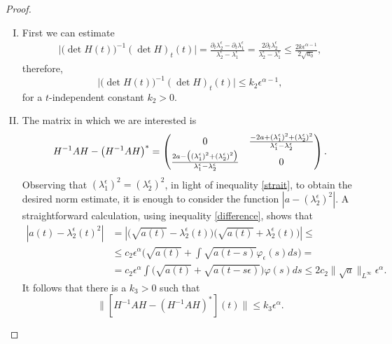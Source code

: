 \documentclass[12pt,oneside,a4paper]{book}
\numberwithin{equation}{section}     %
\theoremstyle{plain}
\theoremstyle{definition}
\begin{document}
\begin{proof}
\begin{enumerate}[I)]
		\item First we can estimate
		\begin{align*}
		\big|\big(\det H(t)\big)^{-1}(\det H)_t(t)\big|= \frac{\partial_t\lambda_2^\epsilon-\partial_t\lambda_1^\epsilon}{\lambda_2^\epsilon-\lambda_1^\epsilon}=\frac{2\partial_t\lambda_2^\epsilon}{\lambda_2^\epsilon-\lambda_1^\epsilon}\leq\frac{2k\epsilon^{\alpha-1}}{2\sqrt{a_0}},
		\end{align*}
		therefore,
		\[
		\big|\big(\det H(t)\big)^{-1}(\det H)_t(t)\big|\leq k_2 \epsilon^{\alpha-1},
		\]
		for a $t$-independent constant $k_2>0$.
		\item The matrix in which we are interested is
		\begin{equation}\notag
		H^{-1}AH-\big(H^{-1}AH\big)^*=\begin{pmatrix}0&\frac{-2a+(\lambda_1^\epsilon)^2+(\lambda_2^\epsilon)^2}{\lambda_1^\epsilon-\lambda_2^\epsilon}\\ \frac{2a-\big((\lambda_1^\epsilon)^2+(\lambda_2^\epsilon)^2\big)}{\lambda_1^\epsilon-\lambda_2^\epsilon}&0\end{pmatrix}.
		\end{equation}
		Observing that $(\lambda_1^\epsilon)^2=(\lambda_2^\epsilon)^2$, in light of inequality \eqref{strait}, to obtain the desired norm estimate, it is enough to consider the function $|a-(\lambda_2^\epsilon)^2|$. A straightforward calculation, using inequality \eqref{difference}, shows that
		\begin{align*}
		|a(t)-\lambda_2^\epsilon(t)^2|&=|\big(\sqrt{a(t)}-\lambda_2^\epsilon(t)\big)\big(\sqrt{a(t)}+\lambda_2^\epsilon(t)\big)|\leq\\
		&\leq c_2\epsilon^\alpha\Big(\sqrt{a(t)}+\int\sqrt{a(t-s)}\varphi_\epsilon(s)ds\Big)=\\&=c_2\epsilon^\alpha\int \big(\sqrt{a(t)} +\sqrt{a(t-s\epsilon)}\big)\varphi(s)ds\leq 2c_2\|\sqrt a\|_{L^\infty} \epsilon^\alpha.
		\end{align*}
		It follows that there is a $k_3>0$ such that
		\[
		\|[H^{-1}AH-(H^{-1}AH)^*](t)\|\leq k_3 \epsilon^\alpha.
		\]
	\end{enumerate}
	

\end{proof}
\end{document}
